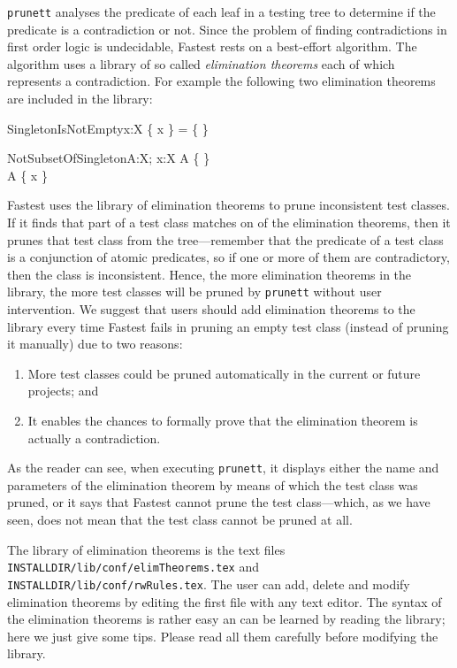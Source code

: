 \verb+prunett+ analyses the predicate of each leaf in a testing tree to determine if the predicate is a contradiction or not. Since the problem of finding contradictions in first order logic is undecidable, Fastest rests on a best-effort algorithm. The algorithm uses a library of so called {\it elimination theorems} each of which represents a contradiction. For example the following two elimination theorems are included in the library:

\begin{theorem}{SingletonIsNotEmpty}{x:X}
\{ x \} = \{ \}
\end{theorem}

\begin{theorem}{NotSubsetOfSingleton}{A:\power X; x:X}
A \neq \{ \} \\
A \subset \{ x \}
\end{theorem}

Fastest uses the library of elimination theorems to prune inconsistent test classes. If it finds that part of a test class matches on of the elimination theorems, then it prunes that test class from the tree---remember that the predicate of a test class is a conjunction of atomic predicates, so if one or more of them are contradictory, then the class is inconsistent. Hence, the more elimination theorems in the library, the more test classes will be pruned by \verb+prunett+ without user intervention. We suggest that users should add elimination theorems to the library every time Fastest fails in pruning an empty test class (instead of pruning it manually) due to two reasons:

\begin{enumerate}
\item More test classes could be pruned automatically in the current or future projects; and 

\item It enables the chances to formally prove that the elimination theorem is actually a contradiction.
\end{enumerate}

As the reader can see, when executing \verb+prunett+, it displays either the name and parameters of the elimination theorem by means of which the test class was pruned, or it says that Fastest cannot prune the test class---which, as we have seen, does not mean that the test class cannot be pruned at all.

The library of elimination theorems is the text files \verb+INSTALLDIR/lib/conf/elimTheorems.tex+ and \verb+INSTALLDIR/lib/conf/rwRules.tex+. The user can add, delete and modify elimination theorems by editing the first file with any text editor. The syntax of the elimination theorems is rather easy an can be learned by reading the library; here we just give some tips. Please read all them carefully before modifying the library. 

